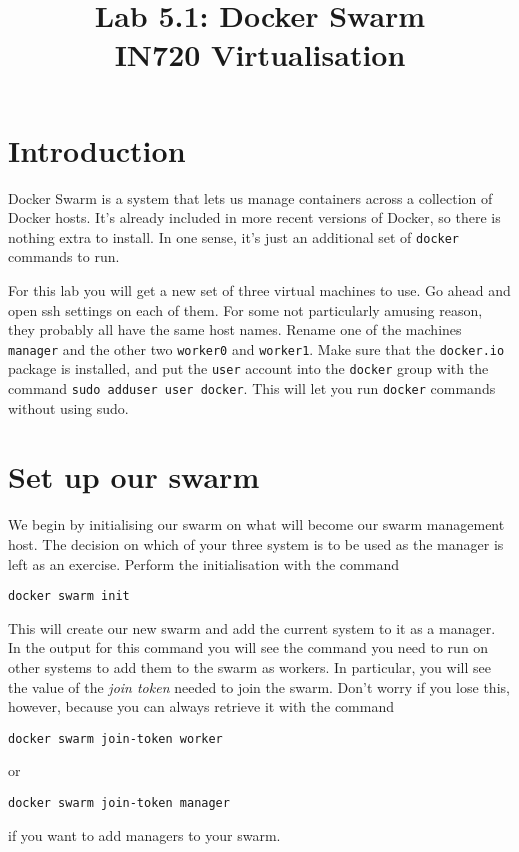 \documentclass{article}
\begin{document}
\title{Lab 5.1: Docker Swarm \\ IN720 Virtualisation}
\date{}
\maketitle

\section*{Introduction}
Docker Swarm is a system that lets us manage containers across a collection of Docker hosts. It's already included in more recent versions of Docker, so there is nothing extra to install. In one sense, it's just an additional set of \texttt{docker} commands to run.

For this lab you will get a new set of three virtual machines to use. Go ahead and open ssh settings on each of them. For some not particularly amusing reason, they probably all have the same host names. Rename one of the machines \texttt{manager} and the other two \texttt{worker0} and \texttt{worker1}. Make sure that the \texttt{docker.io} package is installed, and put the \texttt{user} account into the \texttt{docker} group with the command \texttt{sudo adduser user docker}. This will let you run \texttt{docker} commands without using sudo.

\section{Set up our swarm}

We begin by initialising our swarm on what will become our swarm management host. The decision on which of your three system is to be used as the manager is left as an exercise. Perform the initialisation with the command

\texttt{docker swarm init}

This will create our new swarm and add the current system to it as a manager. In the output for this command you will see the command you need to run on other systems to add them to the swarm as workers. In particular, you will see the value of the \emph{join token} needed to join the swarm. Don't worry if you lose this, however, because you can always retrieve it with the command 

\texttt{docker swarm join-token worker} 

or 

\texttt{docker swarm join-token manager}

if you want to add managers to your swarm.
\end{document}
